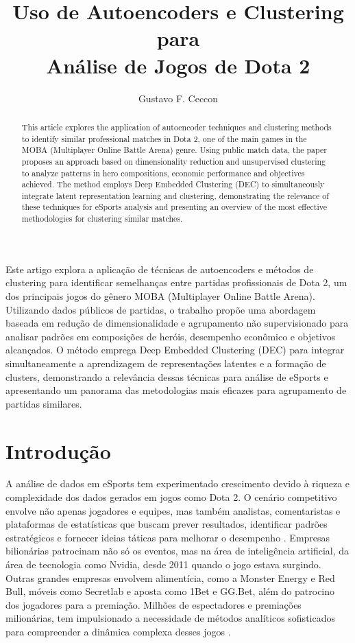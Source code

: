 \documentclass[12pt]{article}
\title{Uso de Autoencoders e Clustering para\\ Análise de Jogos de Dota 2}
\author{Gustavo F. Ceccon\inst{1} }
\begin{document}
 

\maketitle

\begin{abstract}
This article explores the application of autoencoder techniques and clustering methods to identify similar professional matches in Dota 2, one of the main games in the MOBA (Multiplayer Online Battle Arena) genre. Using public match data, the paper proposes an approach based on dimensionality reduction and unsupervised clustering to analyze patterns in hero compositions, economic performance and objectives achieved. The method employs Deep Embedded Clustering (DEC) to simultaneously integrate latent representation learning and clustering, demonstrating the relevance of these techniques for eSports analysis and presenting an overview of the most effective methodologies for clustering similar matches.
\end{abstract}
     
\begin{resumo} 
Este artigo explora a aplicação de técnicas de autoencoders e métodos de clustering para identificar semelhanças entre partidas profissionais de Dota 2, um dos principais jogos do gênero MOBA (Multiplayer Online Battle Arena). Utilizando dados públicos de partidas, o trabalho propõe uma abordagem baseada em redução de dimensionalidade e agrupamento não supervisionado para analisar padrões em composições de heróis, desempenho econômico e objetivos alcançados. O método emprega Deep Embedded Clustering (DEC) para integrar simultaneamente a aprendizagem de representações latentes e a formação de clusters, demonstrando a relevância dessas técnicas para análise de eSports e apresentando um panorama das metodologias mais eficazes para agrupamento de partidas similares.
\end{resumo}


\section{Introdução}

A análise de dados em eSports tem experimentado crescimento devido à riqueza e complexidade dos dados gerados em jogos como Dota 2. O cenário competitivo envolve não apenas jogadores e equipes, mas também analistas, comentaristas e plataformas de estatísticas que buscam prever resultados, identificar padrões estratégicos e fornecer ideias táticas para melhorar o desempenho \cite{drachen2016esports}. Empresas bilionárias patrocinam não só os eventos, mas na área de inteligência artificial, da área de tecnologia como Nvidia, desde 2011 quando o jogo estava surgindo. Outras grandes empresas envolvem alimentícia, como a Monster Energy e Red Bull, móveis como Secretlab e aposta como 1Bet e GG.Bet, além do patrocino dos jogadores para a premiação. Milhões de espectadores e premiações milionárias, tem impulsionado a necessidade de métodos analíticos sofisticados para compreender a dinâmica complexa desses jogos \cite{costa2023artificial}.
\end{document}

